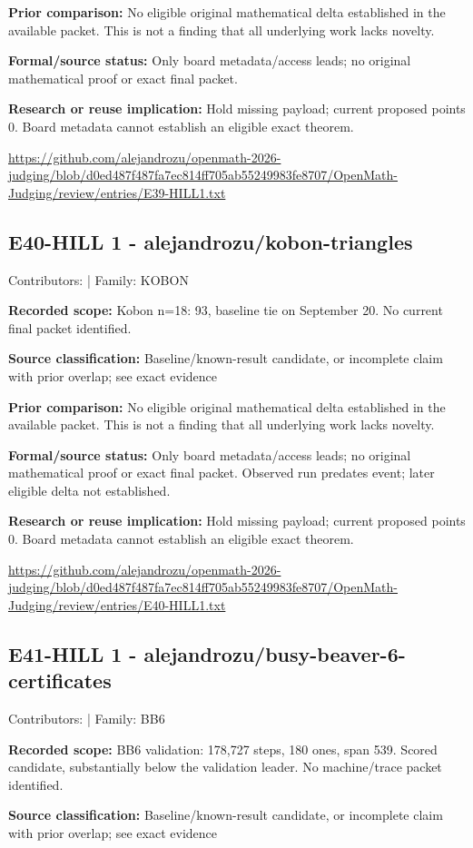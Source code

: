 \documentclass[11pt,a4paper]{article}
\begin{document}
\textbf{Prior comparison:} No eligible original mathematical delta established in the available packet. This is not a finding that all underlying work lacks novelty.

\textbf{Formal/source status:} Only board metadata/access leads; no original mathematical proof or exact final packet. 

\textbf{Research or reuse implication:} Hold missing payload; current proposed points 0. Board metadata cannot establish an eligible exact theorem.

{\small \url{https://github.com/alejandrozu/openmath-2026-judging/blob/d0ed487f487fa7ec814ff705ab55249983fe8707/OpenMath-Judging/review/entries/E39-HILL1.txt}\par}

\begin{samepage}
\subsection{E40-HILL 1  -  alejandrozu/kobon-triangles}
{\small Contributors:  | Family: KOBON\par}

\textbf{Recorded scope:} Kobon n=18: 93, baseline tie on September 20. No current final packet identified.

\end{samepage}
\textbf{Source classification:} Baseline/known-result candidate, or incomplete claim with prior overlap; see exact evidence

\textbf{Prior comparison:} No eligible original mathematical delta established in the available packet. This is not a finding that all underlying work lacks novelty.

\textbf{Formal/source status:} Only board metadata/access leads; no original mathematical proof or exact final packet. Observed run predates event; later eligible delta not established.

\textbf{Research or reuse implication:} Hold missing payload; current proposed points 0. Board metadata cannot establish an eligible exact theorem.

{\small \url{https://github.com/alejandrozu/openmath-2026-judging/blob/d0ed487f487fa7ec814ff705ab55249983fe8707/OpenMath-Judging/review/entries/E40-HILL1.txt}\par}

\begin{samepage}
\subsection{E41-HILL 1  -  alejandrozu/busy-beaver-6-certificates}
{\small Contributors:  | Family: BB6\par}

\textbf{Recorded scope:} BB6 validation: 178,727 steps, 180 ones, span 539. Scored candidate, substantially below the validation leader. No machine/trace packet identified.

\end{samepage}
\textbf{Source classification:} Baseline/known-result candidate, or incomplete claim with prior overlap; see exact evidence
\end{document}
